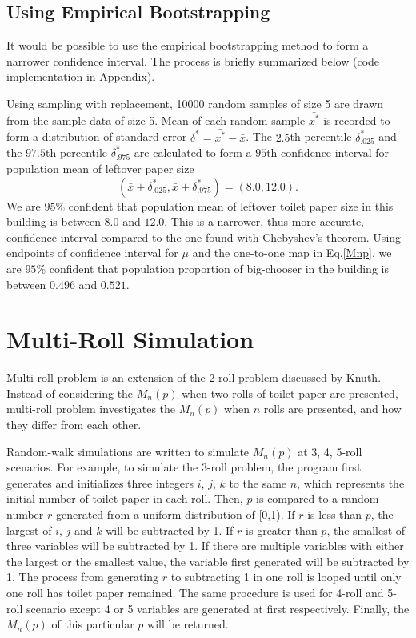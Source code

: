 \documentclass{article}
\begin{document}
\subsection{Using Empirical Bootstrapping}
It would be possible to use the empirical bootstrapping method\cite{bootstrap} to form a narrower confidence interval. The process is briefly summarized below (code implementation in Appendix). 

Using sampling with replacement, 10000 random samples of size 5 are drawn from the sample data of size 5. Mean of each random sample $\bar{x^*}$ is recorded to form a distribution of standard error $\delta^* = \bar{x^*}-\bar{x}$. The $2.5$th percentile $\delta^*_{.025}$ and the $97.5$th percentile $\delta^*_{.975}$ are calculated to form a $95$th confidence interval for population mean of leftover paper size
\begin{equation}
    (\bar{x}+\delta^*_{.025}, \bar{x}+\delta^*_{.975}) 
    = (8.0, 12.0).
\end{equation}
We are $95\%$ confident that population mean of leftover toilet paper size in this building is between $8.0$ and $12.0$. This is a narrower, thus more accurate, confidence interval compared to the one found with Chebyshev's theorem. Using endpoints of confidence interval for $\mu$ and the one-to-one map in Eq.\eqref{Mnp}, we are $95\%$ confident that population proportion of big-chooser in the building is between $0.496$ and $0.521$. 

\section{Multi-Roll Simulation}
Multi-roll problem is an extension of the 2-roll problem discussed by Knuth. Instead of considering the $M_n(p)$ when two rolls of toilet paper are presented, multi-roll problem investigates the $M_n(p)$ when $n$ rolls are presented, and how they differ from each other.

Random-walk simulations are written to simulate $M_n(p)$ at 3, 4, 5-roll scenarios. For example, to simulate the 3-roll problem, the program first generates and initializes three integers $i$, $j$, $k$ to the same $n$, which represents the initial number of toilet paper in each roll. Then, $p$ is compared to a random number $r$ generated from a uniform distribution of [0,1). If $r$ is less than $p$, the largest of $i$, $j$ and $k$ will be subtracted by 1. If $r$ is greater than $p$, the smallest of three variables will be subtracted by 1. If there are multiple variables with either the largest or the smallest value, the variable first generated will be subtracted by 1. The process from generating $r$ to subtracting 1 in one roll is looped until only one roll has toilet paper remained. The same procedure is used for 4-roll and 5-roll scenario except 4 or 5 variables are generated at first respectively. Finally, the $M_n(p)$ of this particular $p$ will be returned.
\end{document}
